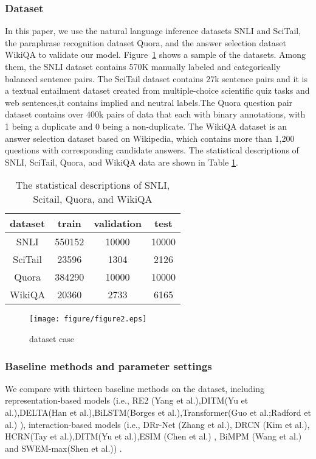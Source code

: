 \documentclass[review]{elsarticle}
\begin{document}
\subsubsection{Dataset}
In this paper, we use the natural language inference datasets SNLI and SciTail, the paraphrase recognition dataset Quora, and the answer selection dataset WikiQA to validate our model. Figure~\ref{fig:2} shows a sample of the datasets. Among them, the SNLI dataset contains 570K manually labeled and categorically balanced sentence pairs. The SciTail dataset contains 27k sentence pairs and it is a textual entailment dataset created from multiple-choice scientific quiz tasks and web sentences,it  contains implied and neutral labels.The Quora question pair dataset contains over 400k pairs of  data that each with binary annotations, with 1 being a duplicate and 0 being a non-duplicate. The WikiQA dataset is an answer selection dataset based on Wikipedia, which contains more than 1,200 questions with corresponding candidate answers.  The statistical descriptions  of SNLI, SciTail, Quora, and WikiQA data are shown in Table \ref{tab:1}.
\begin{table}[htbp]
 \centering
  \caption{\label{tab:1}The statistical descriptions of SNLI, Scitail, Quora, and WikiQA}
\begin{tabular}{cccc}
 \toprule
dataset & train & validation  & test\\
 \midrule
SNLI & 550152 & 10000 & 10000 \\
SciTail & 23596 & 1304 & 2126 \\
Quora & 384290 & 10000 & 10000 \\
WikiQA & 20360 & 2733 & 6165 \\
\bottomrule
 \end{tabular}
\end{table}
\begin{figure}
\centering
\texttt{[image: figure/figure2.eps]}
\caption{dataset case}
\label{fig:2}
\end{figure}
\subsubsection{Baseline methods and parameter settings}
We compare with thirteen baseline methods on the dataset, including  representation-based models (i.e., RE2 (Yang et al.),DITM(Yu et al.),DELTA(Han et al.),BiLSTM(Borges et al.),Transformer(Guo et al.;Radford et al.) ), interaction-based models (i.e., DRr-Net (Zhang et al.), DRCN (Kim et al.), HCRN(Tay et al.),DITM(Yu et al.),ESIM (Chen et al.) , BiMPM (Wang et al.) and SWEM-max(Shen et al.)) .
\end{document}
